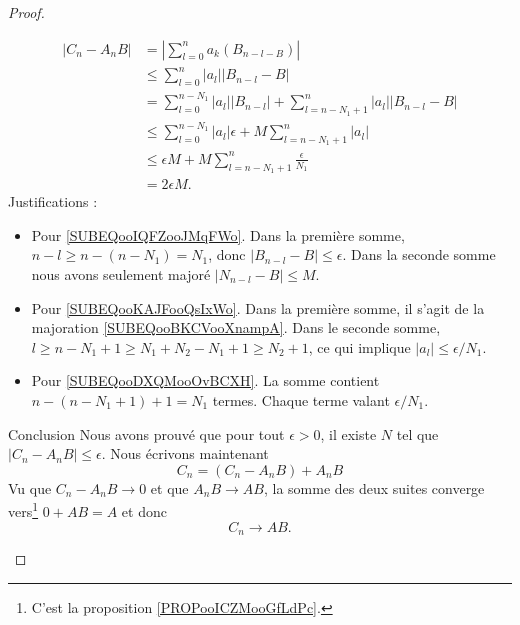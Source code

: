 \begin{proof}
\begin{subproof}
\begin{subequations}
			\begin{align}
				| C_n-A_nB | & =| \sum_{l=0}^na_k(B_{n-l-B}) |                                                                    \\
				             & \leq \sum_{l=0}^n| a_l | |B_{n-l}-B |                                                              \\
				             & =\sum_{l=0}^{n-N_1}| a_l | |B_{n-l} |+\sum_{l=n-N_1+1}^n| a_l | |B_{n-l}-B |                       \\
				             & \leq \sum_{l=0}^{n-N_1}| a_l |\epsilon+M\sum_{l=n-N_1+1}^n| a_l |      \label{SUBEQooIQFZooJMqFWo} \\
				             & \leq \epsilon M +M\sum_{l=n-N_1+1}^n\frac{ \epsilon }{ N_1 }      \label{SUBEQooKAJFooQsIxWo}      \\
				             & =2\epsilon M.   \label{SUBEQooDXQMooOvBCXH}
			\end{align}
		\end{subequations}
		Justifications :
		\begin{itemize}
			\item Pour \eqref{SUBEQooIQFZooJMqFWo}. Dans la première somme, \( n-l\geq n-(n-N_1)=N_1\), donc \( | B_{n-l}-B |\leq \epsilon\). Dans la seconde somme nous avons seulement majoré \( | N_{n-l}-B |\leq M\).
			\item Pour \eqref{SUBEQooKAJFooQsIxWo}. Dans la première somme, il s'agit de la majoration \eqref{SUBEQooBKCVooXnampA}. Dans le seconde somme, \( l\geq n-N_1+1\geq N_1+N_2-N_1+1\geq N_2+1\), ce qui implique \( | a_l |\leq \epsilon/N_1\).
			\item Pour \eqref{SUBEQooDXQMooOvBCXH}. La somme contient \( n-(n-N_1+1)+1=N_1\) termes. Chaque terme valant \( \epsilon/N_1\).
		\end{itemize}
		\item[Conclusion]
		Nous avons prouvé que pour tout \( \epsilon>0\), il existe \( N\) tel que \( | C_n-A_nB |\leq \epsilon\). Nous écrivons maintenant
		\begin{equation}
			C_n=(C_n-A_nB)+A_nB
		\end{equation}
		Vu que \( C_n-A_nB\to 0\) et que \( A_nB\to AB\), la somme des deux suites converge vers\footnote{C'est la proposition \ref{PROPooICZMooGfLdPc}.} \( 0+AB=A\) et donc
		\begin{equation}
			C_n\to AB.
		\end{equation}
	\end{subproof}
\end{proof}

